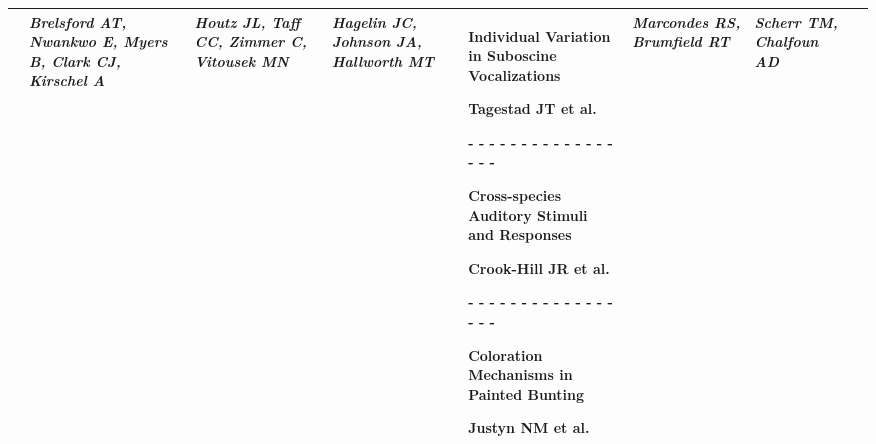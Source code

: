 \begin{tabular}{|x{0.8cm}|x{2.65cm}|x{2.65cm}|a{2.65cm}|x{2.65cm}|x{2.65cm}|x{2.65cm}|@{}m{0pt}@{}}
\hline
{}& \par \vspace{8pt} \textit{Brelsford AT, Nwankwo E, Myers B, Clark CJ, Kirschel A} &  \par \vspace{8pt} \textit{Houtz JL, Taff CC, Zimmer C, Vitousek MN} &  \par \vspace{8pt} \textit{Hagelin JC, Johnson JA, Hallworth MT} & \scriptsize Individual Variation in Suboscine Vocalizations\par \tiny Tagestad JT et al. \par - - - - - - - - - - - - - - - - - \par \vspace{2pt} \scriptsize Cross-species Auditory Stimuli and Responses\par \tiny Crook-Hill JR et al. \par - - - - - - - - - - - - - - - - - \par \vspace{2pt} \scriptsize Coloration Mechanisms in Painted Bunting\par \tiny Justyn NM et al.  &  \par \vspace{8pt} \textit{Marcondes RS, Brumfield RT} &  \par \vspace{8pt} \textit{Scherr TM, Chalfoun AD}&\\[25ex]
\hline

\end{tabular}
